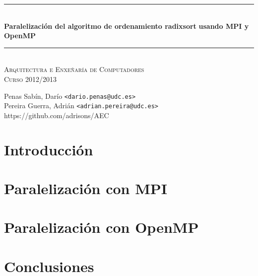 \documentclass[a4paper]{article}
\newcommand{\HRule}{\rule{\linewidth}{0.5mm}}
\begin{document}
		\begin{center}

			\HRule \\[0.4cm]
			{ \huge \bfseries Paralelización del algoritmo de ordenamiento radixsort}
      \vspace{0.2cm}
      { \huge \bfseries usando MPI y OpenMP}\\[0.4cm]
			\HRule \\[0cm]

			\vspace{1cm}
			\textsc{\Large Arquitectura e Enxeñaría de Computadores}\\[0.5cm]
			\textsc{\Large Curso 2012/2013}\\[0.5cm]

		\end{center}


		\vspace{2cm}

		\begin{center}
		Penas Sabín, Darío \texttt{<dario.penas@udc.es>}\\
		\vspace{0.1cm}
		Pereira Guerra, Adrián \texttt{<adrian.pereira@udc.es>}\\
    https://github.com/adrisons/AEC
		\end{center}
		\vspace{2cm}


\tableofcontents
\vspace{3cm}
\clearpage

\section{Introducción}
  	

\clearpage
\section{Paralelización con MPI}
	

\clearpage
\section{Paralelización con OpenMP}
	
\section{Conclusiones}
	
\end{document}

